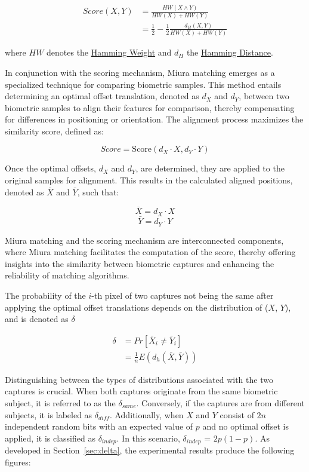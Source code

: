 \begin{equation} \label{eq:score}
    \begin{aligned}
        Score(X, Y) &= \frac{HW(X \land Y)}{HW(X) + HW(Y)}\\
        &= \frac{1}{2}-\frac{1}{2}\frac{d_H(X, Y)}{HW(X) + HW(Y)}
    \end{aligned}
\end{equation}

where \(HW\) denotes the \hyperref[def:Hamming Weight]{Hamming Weight} and \(d_H\) the \hyperref[def:Hamming Distance]{Hamming Distance}. 

In conjunction with the scoring mechanism, Miura matching emerges as a specialized technique for comparing biometric samples. This method entails determining an optimal offset translation, denoted as \(d_X\) and \(d_Y\), between two biometric samples to align their features for comparison, thereby compensating for differences in positioning or orientation. The alignment process maximizes the similarity score, defined as:

\[Score = \text{Score}(d_X \cdot X, d_Y \cdot Y)\]

Once the optimal offsets, \(d_X\) and \(d_Y\), are determined, they are applied to the original samples for alignment. This results in the calculated aligned positions, denoted as \(\bar{X}\) and \(\bar{Y}\), such that:

\[\bar{X} = d_X \cdot X\]
\[\bar{Y} = d_Y \cdot Y\]

Miura matching and the scoring mechanism are interconnected components, where Miura matching facilitates the computation of the score, thereby offering insights into the similarity between biometric captures and enhancing the reliability of matching algorithms.

The probability of the \(i\)-th pixel of two captures not being the same after applying the optimal offset translations depends on the distribution of (\(X\), \(Y\)), and is denoted as \(\delta\)

\begin{equation} \label{eq:delta}
    \begin{aligned}
        \delta &= Pr[\bar{X}_i \neq \bar{Y}_i]\\
        &= \frac{1}{n}E(d_h(\bar{X}, \bar{Y}))
    \end{aligned}
\end{equation}

Distinguishing between the types of distributions associated with the two captures is crucial. When both captures originate from the same biometric subject, it is referred to as the $\delta_{same}$. Conversely, if the captures are from different subjects, it is labeled as $\delta_{diff}$. Additionally, when \(X\) and \(Y\) consist of \(2n\) independent random bits with an expected value of \(p\) and no optimal offset is applied, it is classified as $\delta_{indep}$. In this scenario, \(\delta_{indep}\) = \(2p(1-p)\). As developed in Section~\ref{sec:delta}, the experimental results produce the following figures: 

